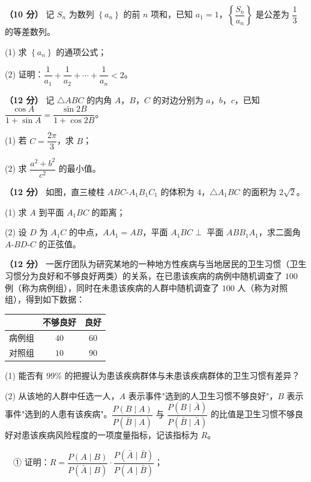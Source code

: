 \textbf{（10 分）} 记 $S_n$ 为数列 $\left\{a_n\right\}$ 的前 $n$ 项和，已知 $a_1=1$，$\left\{\dfrac{S_n}{a_n}\right\}$ 是公差为 $\dfrac13$ 的等差数列。

  (1) 求 $\left\{a_n\right\}$ 的通项公式；

  (2) 证明：$\dfrac1{a_1}+\dfrac1{a_2}+\cdots+\dfrac1{a_n}<2$。

\textbf{（12 分）} 记 $\triangle ABC$ 的内角 $A$，$B$，$C$ 的对边分别为 $a$，$b$，$c$，已知 $\dfrac{\cos A}{1+\sin A}=\dfrac{\sin2B}{1+\cos2B}$。

  (1) 若 $C=\dfrac{2\pi}3$，求 $B$；

  (2) 求 $\dfrac{a^{2}+b^{2}}{c^{2}}$ 的最小值。

\textbf{（12 分）} 如图，直三棱柱 $ABC\text{-}A_1B_1C_1$ 的体积为 $4$，$\triangle A_1BC$ 的面积为 $2\sqrt2$。

\begin{center}\end{center}

  (1) 求 $A$ 到平面 $A_1BC$ 的距离；

  (2) 设 $D$ 为 $A_1C$ 的中点，$AA_1=AB$，平面 $A_1BC\perp$ 平面 $ABB_1A_1$，求二面角 $A\text{-}BD\text{-}C$ 的正弦值。

\textbf{（12 分）} 一医疗团队为研究某地的一种地方性疾病与当地居民的卫生习惯（卫生习惯分为良好和不够良好两类）的关系，在已患该疾病的病例中随机调查了 $100$ 例（称为病例组），同时在未患该疾病的人群中随机调查了 $100$ 人（称为对照组），得到如下数据：

\begin{center}
\begin{tabular}{lcc}
\toprule
 & 不够良好 & 良好 \\
\midrule
病例组 & $40$ & $60$ \\
对照组 & $10$ & $90$ \\
\bottomrule
\end{tabular}
\end{center}

  (1) 能否有 $99\%$ 的把握认为患该疾病群体与未患该疾病群体的卫生习惯有差异？

  (2) 从该地的人群中任选一人，$A$ 表示事件"选到的人卫生习惯不够良好"，$B$ 表示事件"选到的人患有该疾病"。$\dfrac{P(B\mid A)}{P(\bar B\mid A)}$ 与 $\dfrac{P(B\mid\bar A)}{P(\bar B\mid\bar A)}$ 的比值是卫生习惯不够良好对患该疾病风险程度的一项度量指标，记该指标为 $R$。

  　① 证明：$R=\dfrac{P(A\mid B)}{P(\bar A\mid B)}\cdot\dfrac{P(\bar A\mid\bar B)}{P(A\mid\bar B)}$；

